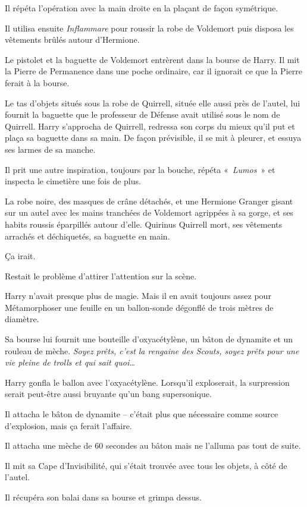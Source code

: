 Il répéta l'opération avec la main droite en la plaçant de façon symétrique.

Il utilisa ensuite \emph{Inflammare} pour roussir la robe de Voldemort puis disposa les vêtements brûlés autour d'Hermione.

Le pistolet et la baguette de Voldemort entrèrent dans la bourse de Harry. Il mit la Pierre de Permanence dans une poche ordinaire, car il ignorait ce que la Pierre ferait à la bourse.

Le tas d'objets situés sous la robe de Quirrell, située elle aussi près de l'autel, lui fournit la baguette que le professeur de Défense avait utilisé sous le nom de Quirrell. Harry s'approcha de Quirrell, redressa son corps du mieux qu'il put et plaça sa baguette dans sa main. De façon prévisible, il se mit à pleurer, et essuya ses larmes de sa manche.

Il prit une autre inspiration, toujours par la bouche, répéta «~\emph{Lumos}~» et inspecta le cimetière une fois de plus.

La robe noire, des masques de crâne détachés, et une Hermione Granger gisant sur un autel avec les mains tranchées de Voldemort agrippées à sa gorge, et ses habits roussis éparpillés autour d'elle. Quirinus Quirrell mort, ses vêtements arrachés et déchiquetés, sa baguette en main.

Ça irait.

Restait le problème d'attirer l'attention sur la scène.

Harry n'avait presque plus de magie. Mais il en avait toujours assez pour Métamorphoser une feuille en un ballon-sonde dégonflé de trois mètres de diamètre.

Sa bourse lui fournit une bouteille d'oxyacétylène, un bâton de dynamite et un rouleau de mèche. \emph{Soyez prêts, c'est la rengaine des Scouts, soyez prêts pour une vie pleine de trolls et qui sait quoi…}

Harry gonfla le ballon avec l'oxyacétylène. Lorsqu'il exploserait, la surpression serait peut-être aussi bruyante qu'un bang supersonique.

Il attacha le bâton de dynamite -- c'était plus que nécessaire comme source d'explosion, mais ça ferait l'affaire.

Il attacha une mèche de 60 secondes au bâton mais ne l'alluma pas tout de suite.

Il mit sa Cape d'Invisibilité, qui s'était trouvée avec tous les objets, à côté de l'autel.

Il récupéra son balai dans sa bourse et grimpa dessus.

